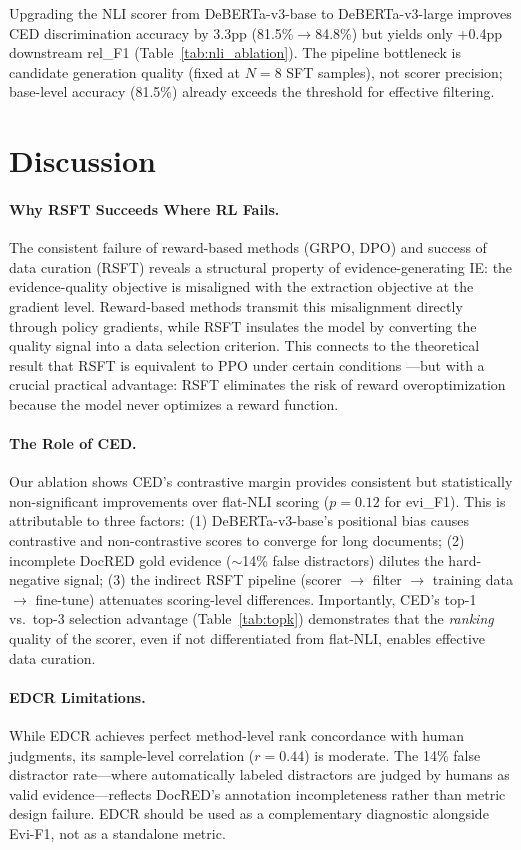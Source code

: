 \documentclass[11pt]{article}
\begin{document}
Upgrading the NLI scorer from DeBERTa-v3-base to DeBERTa-v3-large improves CED discrimination accuracy by 3.3pp (81.5\%$\to$84.8\%) but yields only +0.4pp downstream rel\_F1 (Table~\ref{tab:nli_ablation}).
The pipeline bottleneck is candidate generation quality (fixed at $N{=}8$ SFT samples), not scorer precision; base-level accuracy (81.5\%) already exceeds the threshold for effective filtering.

\section{Discussion}

\paragraph{Why RSFT Succeeds Where RL Fails.}
The consistent failure of reward-based methods (GRPO, DPO) and success of data curation (RSFT) reveals a structural property of evidence-generating IE: the evidence-quality objective is misaligned with the extraction objective at the gradient level.
Reward-based methods transmit this misalignment directly through policy gradients, while RSFT insulates the model by converting the quality signal into a data selection criterion.
This connects to the theoretical result that RSFT is equivalent to PPO under certain conditions \cite{dong2024raft}---but with a crucial practical advantage: RSFT eliminates the risk of reward overoptimization because the model never optimizes a reward function.

\paragraph{The Role of CED.}
Our ablation shows CED's contrastive margin provides consistent but statistically non-significant improvements over flat-NLI scoring ($p{=}0.12$ for evi\_F1).
This is attributable to three factors: (1) DeBERTa-v3-base's positional bias causes contrastive and non-contrastive scores to converge for long documents; (2) incomplete DocRED gold evidence (${\sim}$14\% false distractors) dilutes the hard-negative signal; (3) the indirect RSFT pipeline (scorer $\to$ filter $\to$ training data $\to$ fine-tune) attenuates scoring-level differences.
Importantly, CED's top-1 vs.\ top-3 selection advantage (Table~\ref{tab:topk}) demonstrates that the \emph{ranking} quality of the scorer, even if not differentiated from flat-NLI, enables effective data curation.

\paragraph{EDCR Limitations.}
While EDCR achieves perfect method-level rank concordance with human judgments, its sample-level correlation ($r{=}0.44$) is moderate.
The 14\% false distractor rate---where automatically labeled distractors are judged by humans as valid evidence---reflects DocRED's annotation incompleteness rather than metric design failure.
EDCR should be used as a complementary diagnostic alongside Evi-F1, not as a standalone metric.
\end{document}

